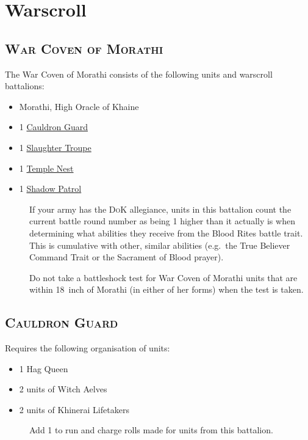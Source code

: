 \newpage
\hypertarget{Warscroll}{%
    \section{Warscroll}\label{warscroll}}
\subsection{\textsc{War Coven of Morathi}}
The \hypertarget{war-coven}{War Coven} of Morathi consists of the following
units and warscroll battalions:
\begin{itemize}
    \tightlist
    \item Morathi, High Oracle of Khaine
    \item 1 \hyperref[cauldron-guard]{Cauldron Guard}
    \item 1 \hyperref[slaughter-troupe]{Slaughter Troupe}
    \item 1 \hyperref[temple-nest]{Temple Nest}
    \item 1 \hyperref[shadow-patrol]{Shadow Patrol}
\end{itemize}
\begin{description}
    \item [] If your army has the
        \textsc{DoK} allegiance, units in this battalion count the
        current battle round number as being 1 higher than it actually is when
        determining what abilities they receive from the Blood Rites battle
        trait. This is cumulative with other, similar abilities
        (e.g.~the True Believer Command Trait or the Sacrament of Blood
        prayer).  \item [] Do not
            take a battleshock test for War Coven of Morathi units that are
            within 18~inch of Morathi (in either of her forms) when the test is
            taken. 
\end{description}
        
\subsection{\textsc{Cauldron Guard}}
Requires the following organisation of units:
\begin{itemize}
    \tightlist
    \item 1 Hag Queen
    \item 2 units of Witch Aelves
    \item 2 units of Khinerai Lifetakers
\end{itemize}
\begin{description}
    \item [] Add 1 to run and
        charge rolls made for units from this battalion. 
\end{description}
        
